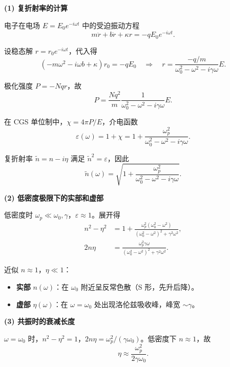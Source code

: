 \begin{derivationbox}[标准解题过程]
\textbf{(1) 复折射率的计算}

电子在电场 $E=E_0e^{-i\omega t}$ 中的受迫振动方程
\begin{equation}
m\ddot{r}+b\dot{r}+\kappa r=-qE_0e^{-i\omega t}.
\end{equation}

设稳态解 $r=r_0e^{-i\omega t}$，代入得
\begin{equation}
(-m\omega^2-i\omega b+\kappa)r_0=-qE_0
\quad\Longrightarrow\quad
r=\frac{-q/m}{\omega_0^2-\omega^2-i\gamma\omega}E.
\end{equation}

极化强度 $P=-Nqr$，故
\begin{equation}
P=\frac{Nq^2}{m}\frac{1}{\omega_0^2-\omega^2-i\gamma\omega}E.
\end{equation}

在 CGS 单位制中，$\chi=4\pi P/E$，介电函数
\begin{equation}
\varepsilon(\omega)=1+\chi=1+\frac{\omega_p^2}{\omega_0^2-\omega^2-i\gamma\omega}.
\end{equation}

复折射率 $\tilde{n}=n-i\eta$ 满足 $\tilde{n}^2=\varepsilon$，因此
\begin{equation}
\boxed{\tilde{n}(\omega)=\sqrt{1+\frac{\omega_p^2}{\omega_0^2-\omega^2-i\gamma\omega}}.}
\end{equation}

\textbf{(2) 低密度极限下的实部和虚部}

低密度时 $\omega_p\ll\omega_0,\gamma$，$\varepsilon\approx1$。展开得
\begin{align}
n^2-\eta^2&=1+\frac{\omega_p^2(\omega_0^2-\omega^2)}{(\omega_0^2-\omega^2)^2+\gamma^2\omega^2},\\
2n\eta&=\frac{\omega_p^2\gamma\omega}{(\omega_0^2-\omega^2)^2+\gamma^2\omega^2}.
\end{align}

近似 $n\approx1$，$\eta\ll1$：
\begin{itemize}
    \item \textbf{实部} $n(\omega)$：在 $\omega_0$ 附近呈反常色散（S 形，先升后降）。
    \item \textbf{虚部} $\eta(\omega)$：在 $\omega=\omega_0$ 处出现洛伦兹吸收峰，峰宽 $\sim\gamma$。
\end{itemize}

\textbf{(3) 共振时的衰减长度}

$\omega=\omega_0$ 时，$n^2-\eta^2=1$，$2n\eta=\omega_p^2/(\gamma\omega_0)$。低密度下 $n\approx1$，故
\begin{equation}
\eta\approx\frac{\omega_p^2}{2\gamma\omega_0}.
\end{equation}


\end{derivationbox}
